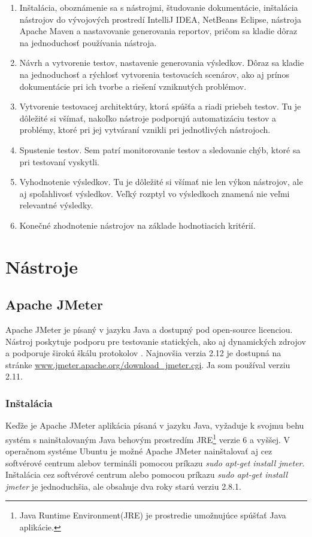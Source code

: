\documentclass[12pt,oneside,final]{fithesis-utf8}
\begin{document}
\begin{enumerate}

\item Inštalácia, oboznámenie sa s nástrojmi, študovanie dokumentácie, inštalácia nástrojov do vývojových prostredí IntelliJ IDEA, NetBeans Eclipse, nástroja Apache Maven a nastavovanie generovania reportov, pričom sa kladie dôraz na jednoduchosť používania nástroja.

\item Návrh a vytvorenie testov, nastavenie generovania výsledkov. Dôraz sa kladie na jednoduchosť a rýchlosť vytvorenia testovacích scenárov, ako aj prínos dokumentácie pri ich tvorbe a riešení vzniknutých problémov.

\item Vytvorenie testovacej architektúry, ktorá spúšťa a riadi priebeh testov. Tu je dôležité si všímať, nakoľko nástroje podporujú automatizáciu testov a problémy, ktoré pri jej vytváraní vznikli pri jednotlivých nástrojoch.

\item Spustenie testov. Sem patrí monitorovanie testov a sledovanie chýb, ktoré sa pri testovaní vyskytli. 

\item Vyhodnotenie výsledkov. Tu je dôležité si všímať nie len výkon nástrojov, ale aj spoľahlivosť výsledkov. Veľký rozptyl vo výsledkoch znamená nie veľmi relevantné výsledky.

\item Konečné zhodnotenie nástrojov na základe hodnotiacich kritérií.

\end{enumerate}

\chapter{Nástroje}

\section{Apache JMeter}
Apache JMeter je písaný v jazyku Java a dostupný pod open-source licenciou. Nástroj poskytuje podporu pre testovanie statických, ako aj dynamických zdrojov a podporuje širokú škálu protokolov \cite{Apache}. Najnovšia verzia 2.12 je dostupná na stránke \url{www.jmeter.apache.org/download_jmeter.cgi}. Ja som používal verziu 2.11.

\subsection{Inštalácia}
Keďže je Apache JMeter aplikácia písaná v jazyku Java, vyžaduje k svojmu behu systém s nainštalovaným Java behovým prostredím JRE\footnote{Java Runtime Environment(JRE) je prostredie umožnujúce spúšťať Java aplikácie.} verzie 6 a vyššej. V operačnom systéme Ubuntu je možné Apache JMeter nainštalovať aj cez softvérové centrum alebov termináli pomocou príkazu \textit{sudo apt-get install jmeter}. Inštalácia cez softvérové centrum alebo pomocou príkazu \textit{sudo apt-get install jmeter} je jednoduchšia, ale obsahuje dva roky starú verziu 2.8.1.
\end{document}
